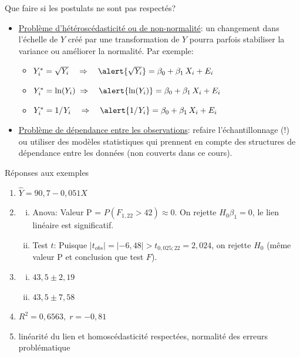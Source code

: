 \documentclass{BeamerTemplate}
\begin{document}
\begin{frame}[t]{Que faire si les postulats ne sont pas respectés?}

{\small
\begin{itemize}
\item \underline{Problème d'hétéroscédasticité ou de non-normalité}: un changement dans l'échelle de $Y$ créé par \alert{une transformation de $Y$} pourra parfois stabiliser la variance ou améliorer la normalité. Par exemple:
    \begin{itemize}\itemsep2mm
    \item $Y_i^*=\sqrt{Y_i}\quad\Rightarrow\quad \alert{\sqrt{Y_i}}=\beta_0+\beta_1\,X_i+E_i$
    \item $Y_i^*=\text{ln}(Y_i)\;\Rightarrow\quad \alert{\text{ln}(Y_i)}=\beta_0+\beta_1\,X_i+E_i$
    \item $Y_i^*=1/Y_i\quad\Rightarrow\quad \alert{1/Y_i}=\beta_0+\beta_1\,X_i+E_i$
    \end{itemize}
\item  \underline{Problème de dépendance entre les observations}: refaire l'échantillonnage (!) ou utiliser des modèles statistiques qui prennent en compte des structures de dépendance entre les données (non couverts dans ce cours).
\end{itemize}
}
\end{frame}


\begin{frame}[t]{Réponses aux exemples}

{\scriptsize

\begin{enumerate}\itemsep 1mm
  \item  $\hat Y = 90,7 - 0,051 X$
  \item {\scriptsize
\begin{enumerate}[(i)]\itemsep 1mm
        \item  Anova: Valeur P = $P(F_{1,22}>42)\approx 0$. On rejette $H_0\beta_1=0$, le lien linéaire est significatif.
        \item Test $t$: Puisque $|t_{obs}|=|-6,48| > t_{0,025;22}=2,024$, on rejette $H_0$ (même valeur P et conclusion que test $F$).
        \end{enumerate}}
  \item \begin{enumerate}[(i)]\itemsep 1mm
        \item $ 43,5\pm 2,19$
        \item $ 43,5\pm 7,58$
        \end{enumerate}
  \item $R^2=0,6563,\; r=-0,81$
 \item linéarité du lien et homoscédasticité respectées, normalité des erreurs problématique
  \end{enumerate}

 }
\end{frame}
\end{document}

